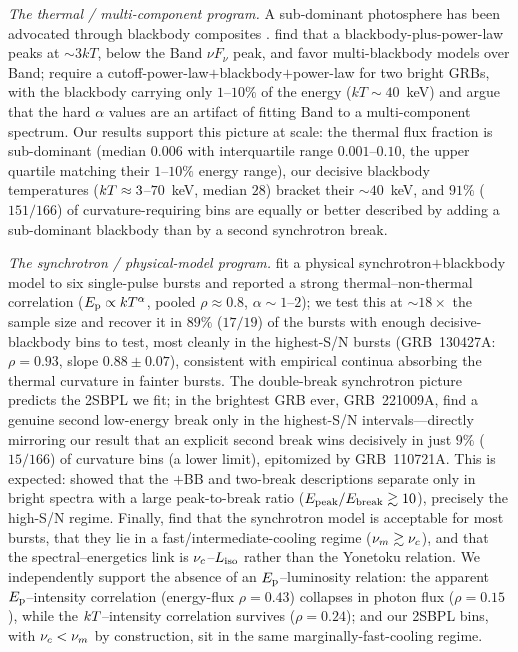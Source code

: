 \emph{The thermal / multi-component program.}
A sub-dominant photosphere has been advocated through blackbody composites
\citep{Ryde2004,Guiriec2010,Guiriec2011,Guiriec2015,Basak2014}. \citet{Basak2014}
find that a blackbody-plus-power-law peaks at $\sim3kT$, below the Band $\nu
F_\nu$ peak, and favor multi-blackbody models over Band; \citet{Guiriec2015}
require a cutoff-power-law$+$blackbody$+$power-law for two bright GRBs, with the
blackbody carrying only $1$--$10\%$ of the energy ($kT\sim40$~keV) and argue that
the hard $\alpha$ values are an artifact of fitting Band to a multi-component
spectrum. Our results support this picture at scale: the thermal flux fraction
is sub-dominant (median $0.006$ with interquartile range $0.001$--$0.10$, the
upper quartile matching their $1$--$10\%$ energy range), our decisive blackbody
temperatures ($kT\approx3$--$70$~keV, median $28$) bracket their
$\sim$$40$~keV, and $91\%$ ($151/166$) of curvature-requiring bins are equally
or better described by adding a sub-dominant blackbody than by a second
synchrotron break.

\emph{The synchrotron / physical-model program.}
\citet{Burgess2014a} fit a physical synchrotron$+$blackbody model to six
single-pulse bursts and reported a strong thermal--non-thermal correlation
($E_{\rm p}\propto kT^{\alpha}$, pooled $\rho\approx0.8$, $\alpha\sim1$--$2$); we test
this at $\sim$$18\times$ the sample size and recover it in $89\%$ ($17/19$) of
the bursts with enough decisive-blackbody bins to test, most cleanly in the
highest-S/N bursts (GRB~130427A: $\rho=0.93$, slope $0.88\pm0.07$), consistent
with empirical continua absorbing the thermal curvature in fainter bursts. The
double-break synchrotron picture \citep{Oganesyan2017,Ravasio2018,Ravasio2019}
predicts the 2SBPL we fit; in the brightest GRB ever, GRB~221009A,
\citet{Ravasio2023} find a genuine second low-energy break only in the
highest-S/N intervals---directly mirroring our result that an explicit second
break wins decisively in just $9\%$ ($15/166$) of curvature bins (a lower
limit), epitomized by GRB~110721A. This is expected: \citet{Ravasio2018} showed
that the $+$BB and two-break descriptions separate only in bright spectra with
a large peak-to-break ratio ($E_{\rm peak}/E_{\rm break}\gtrsim10$), precisely
the high-S/N regime. Finally, \citet{Mei2025} find that the
synchrotron model is acceptable for most bursts, that they lie in a
fast/intermediate-cooling regime ($\nu_m\gtrsim\nu_c$), and that the
spectral--energetics link is $\nu_c$--$L_{\rm iso}$ rather than the Yonetoku relation. We
independently support the absence of an $E_{\rm p}$--luminosity relation: the apparent
$E_{\rm p}$--intensity correlation (energy-flux $\rho=0.43$) collapses in photon flux
($\rho=0.15$), while the $kT$--intensity correlation survives ($\rho=0.24$); and
our 2SBPL bins, with $\nu_c<\nu_m$ by construction, sit in the same
marginally-fast-cooling regime.

